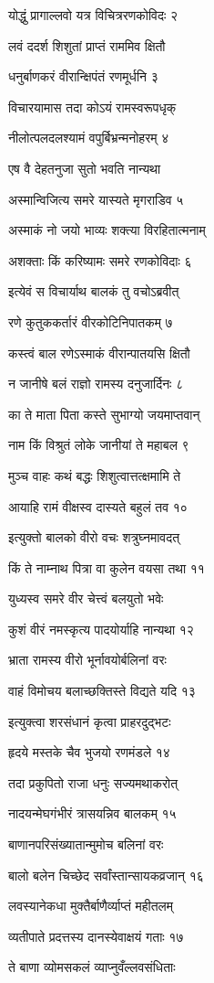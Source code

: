 योद्धुं प्रागाल्लवो यत्र विचित्ररणकोविदः २

लवं ददर्श शिशुतां प्राप्तं राममिव क्षितौ

धनुर्बाणकरं वीरान्क्षिपंतं रणमूर्धनि ३

विचारयामास तदा कोऽयं रामस्वरूपधृक्

नीलोत्पलदलश्यामं वपुर्बिभ्रन्मनोहरम् ४

एष वै देहतनुजा सुतो भवति नान्यथा

अस्मान्विजित्य समरे यास्यते मृगराडिव ५

अस्माकं नो जयो भाव्यः शक्त्या विरहितात्मनाम्

अशक्ताः किं करिष्यामः समरे रणकोविदाः ६

इत्येवं स विचार्याथ बालकं तु वचोऽब्रवीत्

रणे कुतुककर्तारं वीरकोटिनिपातकम् ७

कस्त्वं बाल रणेऽस्माकं वीरान्पातयसि क्षितौ

न जानीषे बलं राज्ञो रामस्य दनुजार्दिनः ८

का ते माता पिता कस्ते सुभाग्यो जयमाप्तवान्

नाम किं विश्रुतं लोके जानीयां ते महाबल ९

मुञ्च वाहः कथं बद्धः शिशुत्वात्तत्क्षमामि ते

आयाहि रामं वीक्षस्व दास्यते बहुलं तव १०

इत्युक्तो बालको वीरो वचः शत्रुघ्नमावदत्

किं ते नाम्नाथ पित्रा वा कुलेन वयसा तथा ११

युध्यस्व समरे वीर चेत्त्वं बलयुतो भवेः

कुशं वीरं नमस्कृत्य पादयोर्याहि नान्यथा १२

भ्राता रामस्य वीरो भूर्नावयोर्बलिनां वरः

वाहं विमोचय बलाच्छक्तिस्ते विद्यते यदि १३

इत्युक्त्वा शरसंधानं कृत्वा प्राहरदुद्भटः

हृदये मस्तके चैव भुजयो रणमंडले १४

तदा प्रकुपितो राजा धनुः सज्यमथाकरोत्

नादयन्मेघगंभीरं त्रासयन्निव बालकम् १५

बाणानपरिसंख्यातान्मुमोच बलिनां वरः

बालो बलेन चिच्छेद सर्वांस्तान्सायकव्रजान् १६

लवस्यानेकधा मुक्तैर्बाणैर्व्याप्तं महीतलम्

व्यतीपाते प्रदत्तस्य दानस्येवाक्षयं गताः १७

ते बाणा व्योमसकलं व्याप्नुवँल्लवसंधिताः

